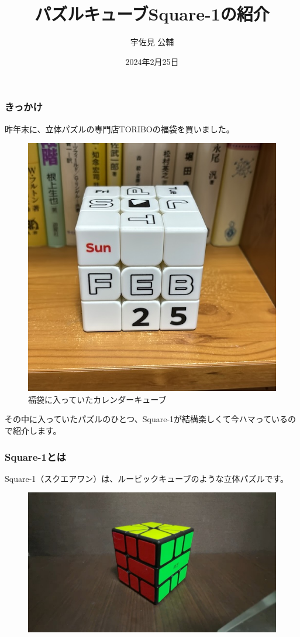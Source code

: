 \documentclass{beamer}
\title{パズルキューブSquare-1の紹介}
\author{宇佐見 公輔}
\date{2024年2月25日}
\begin{document}
\maketitle

\begin{frame}
    \frametitle{きっかけ}

    昨年末に、立体パズルの専門店TORIBOの福袋を買いました。

    \begin{figure}
        \centering
        \caption{福袋に入っていたカレンダーキューブ}
        \includegraphics[width=0.40\columnwidth,height=0.40\columnwidth]{images/calendar.jpg}
    \end{figure}

    その中に入っていたパズルのひとつ、Square-1が結構楽しくて今ハマっているので紹介します。
\end{frame}

\begin{frame}
    \frametitle{Square-1とは}

    Square-1（スクエアワン）は、ルービックキューブのような立体パズルです。

    \begin{figure}
        \centering
        \includegraphics[width=0.96\columnwidth,height=0.54\columnwidth]{images/square-1.jpg}
    \end{figure}
\end{frame}
\end{document}
